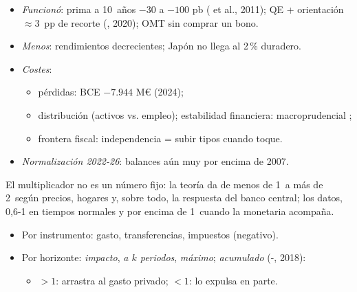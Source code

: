 \documentclass{article}
\begin{document}
\begin{columnas}
\begin{itemize}
\item \emph{Funcionó}: prima a 10~años $-30$ a $-100$ pb ( et al., 2011); QE + orientación $\approx$3~pp de recorte (, 2020); OMT sin comprar un bono.
\item \emph{Menos}: rendimientos decrecientes; Japón no llega al 2\,\% duradero.
\item \emph{Costes}:
  \begin{itemize}
  \item pérdidas: BCE $-7.944$ M€ (2024);
  \item distribución (activos vs. empleo); estabilidad financiera: macroprudencial ;
  \item frontera fiscal: independencia = subir tipos cuando toque.
  \end{itemize}
\item \emph{Normalización 2022-26}: balances aún muy por encima de 2007.
\end{itemize}

\begin{ideaclave}
El multiplicador no es un número fijo: la teoría da de menos de 1~a más de 2~según precios, hogares y, sobre todo, la respuesta del banco central; los datos, 0,6-1 en tiempos normales y por encima de 1~cuando la monetaria acompaña.
\end{ideaclave}

\begin{itemize}
\item Por instrumento: gasto, transferencias, impuestos (negativo).
\item Por horizonte: \emph{impacto}, \emph{a $k$ periodos}, \emph{máximo}; \emph{acumulado} (-, 2018):
  \begin{itemize}
  \item $>1$: arrastra al gasto privado; $<1$: lo expulsa en parte.
  \end{itemize}
\end{itemize}


\end{columnas}
\end{document}

